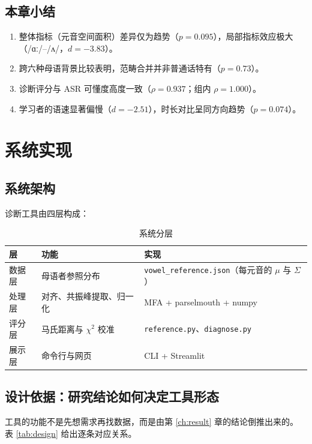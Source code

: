 \documentclass[12pt,a4paper,fontset=fandol]{ctexrep}
\newcommand{\ipa}[1]{/#1/}
\begin{document}
\section{本章小结}

\begin{enumerate}[leftmargin=2em,itemsep=2pt]
  \item 整体指标（元音空间面积）差异仅为趋势（$p=0.095$），局部指标效应极大
        （\ipa{ɑː}–\ipa{ʌ}，$d=-3.83$）。
  \item 跨六种母语背景比较表明，范畴合并并非普通话特有（$p=0.73$）。
  \item 诊断评分与 ASR 可懂度高度一致（$\rho=0.937$；组内 $\rho=1.000$）。
  \item 学习者的语速显著偏慢（$d=-2.51$），时长对比呈同方向趋势（$p=0.074$）。
\end{enumerate}

\chapter{系统实现}\label{ch:system}

\section{系统架构}

诊断工具由四层构成：

\begin{table}[H]
\centering
\caption{系统分层}
\label{tab:arch}
\begin{tabular}{lll}
\toprule
层 & 功能 & 实现 \\
\midrule
数据层 & 母语者参照分布 & \texttt{vowel\_reference.json}（每元音的 $\mu$ 与 $\Sigma$） \\
处理层 & 对齐、共振峰提取、归一化 & MFA + parselmouth + numpy \\
评分层 & 马氏距离与 $\chi^2$ 校准 & \texttt{reference.py}、\texttt{diagnose.py} \\
展示层 & 命令行与网页 & CLI + Streamlit \\
\bottomrule
\end{tabular}
\end{table}

\section{设计依据：研究结论如何决定工具形态}

工具的功能不是先想需求再找数据，而是由第 \ref{ch:result} 章的结论倒推出来的。
表 \ref{tab:design} 给出逐条对应关系。
\end{document}
